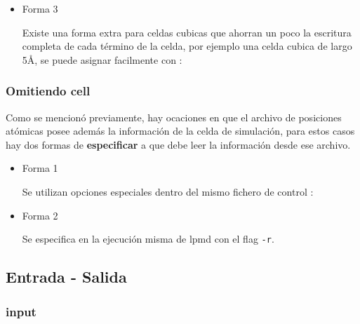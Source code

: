 \begin{itemize}


\item{Forma 3}

Existe una forma extra para celdas cubicas que ahorran un poco la escritura
completa de cada t\'ermino de la celda, por ejemplo una celda cubica de largo
5\AA, se puede asignar facilmente con :


\end{itemize}

\subsubsection{Omitiendo cell}

Como se mencion\'o previamente, hay ocaciones en que el archivo de posiciones
at\'omicas posee adem\'as la informaci\'on de la celda de simulaci\'on, para
estos casos hay dos formas de \textbf{especificar} a {\lpmd} que debe leer la
informaci\'on desde ese archivo.

\begin{itemize} 
\item{Forma 1}

Se utilizan opciones especiales dentro del mismo fichero de control :


\item{Forma 2}

Se especifica en la ejecuci\'on misma de lpmd con el flag \verb|-r|.


\end{itemize}

\subsection{Entrada - Salida}

\subsubsection{input}

